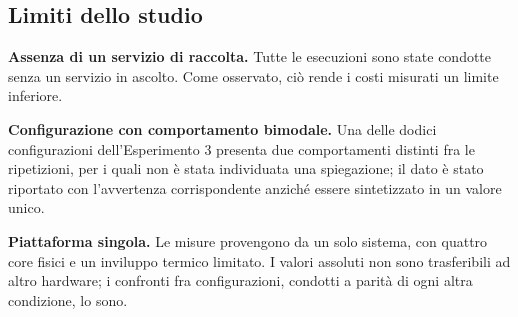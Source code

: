 \subsection{Limiti dello studio}

\textbf{Assenza di un servizio di raccolta.} Tutte le esecuzioni sono state condotte senza un
servizio in ascolto. Come osservato, ci\`o rende i costi misurati un limite inferiore.

\textbf{Configurazione con comportamento bimodale.} Una delle dodici configurazioni
dell'Esperimento 3 presenta due comportamenti distinti fra le ripetizioni, per i quali non \`e stata
individuata una spiegazione; il dato \`e stato riportato con l'avvertenza corrispondente anzich\'e
essere sintetizzato in un valore unico.

\textbf{Piattaforma singola.} Le misure provengono da un solo sistema, con quattro core fisici e un
inviluppo termico limitato. I valori assoluti non sono trasferibili ad altro hardware; i confronti
fra configurazioni, condotti a parit\`a di ogni altra condizione, lo sono.
